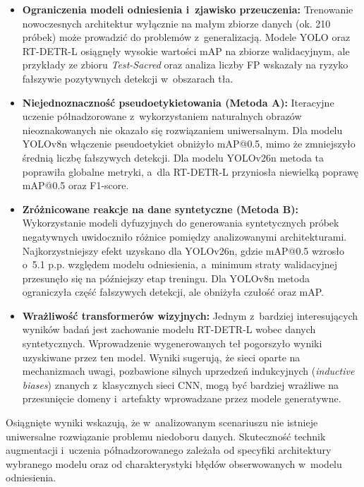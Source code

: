 \begin{itemize}
    \item \textbf{Ograniczenia modeli odniesienia i~zjawisko przeuczenia:} Trenowanie nowoczesnych architektur wyłącznie na małym zbiorze danych (ok. 210 próbek) może prowadzić do problemów z~generalizacją. Modele YOLO oraz RT-DETR-L osiągnęły wysokie wartości mAP na zbiorze walidacyjnym, ale przykłady ze zbioru \emph{Test-Sacred} oraz analiza liczby FP wskazały na ryzyko fałszywie pozytywnych detekcji w~obszarach tła.
    
    \item \textbf{Niejednoznaczność pseudoetykietowania (Metoda A):} Iteracyjne uczenie półnadzorowane z~wykorzystaniem naturalnych obrazów nieoznakowanych nie okazało się rozwiązaniem uniwersalnym. Dla modelu YOLOv8n włączenie pseudoetykiet obniżyło mAP@0.5, mimo że zmniejszyło średnią liczbę fałszywych detekcji. Dla modelu YOLOv26n metoda ta poprawiła globalne metryki, a~dla RT-DETR-L przyniosła niewielką poprawę mAP@0.5 oraz F1-score.
    
    \item \textbf{Zróżnicowane reakcje na dane syntetyczne (Metoda B):} Wykorzystanie modeli dyfuzyjnych do generowania syntetycznych próbek negatywnych uwidoczniło różnice pomiędzy analizowanymi architekturami. Najkorzystniejszy efekt uzyskano dla YOLOv26n, gdzie mAP@0.5 wzrosło o~5.1 p.p. względem modelu odniesienia, a~minimum straty walidacyjnej przesunęło się na późniejszy etap treningu. Dla YOLOv8n metoda ograniczyła część fałszywych detekcji, ale obniżyła czułość oraz mAP.
    
    \item \textbf{Wrażliwość transformerów wizyjnych:} Jednym z~bardziej interesujących wyników badań jest zachowanie modelu RT-DETR-L wobec danych syntetycznych. Wprowadzenie wygenerowanych teł pogorszyło wyniki uzyskiwane przez ten model. Wyniki sugerują, że sieci oparte na mechanizmach uwagi, pozbawione silnych uprzedzeń indukcyjnych (\textit{inductive biases}) znanych z~klasycznych sieci CNN, mogą być bardziej wrażliwe na przesunięcie domeny i~artefakty wprowadzane przez modele generatywne.
\end{itemize}

Osiągnięte wyniki wskazują, że w~analizowanym scenariuszu nie istnieje uniwersalne rozwiązanie problemu niedoboru danych. Skuteczność technik augmentacji i~uczenia półnadzorowanego zależała od specyfiki architektury wybranego modelu oraz od charakterystyki błędów obserwowanych w~modelu odniesienia. 

